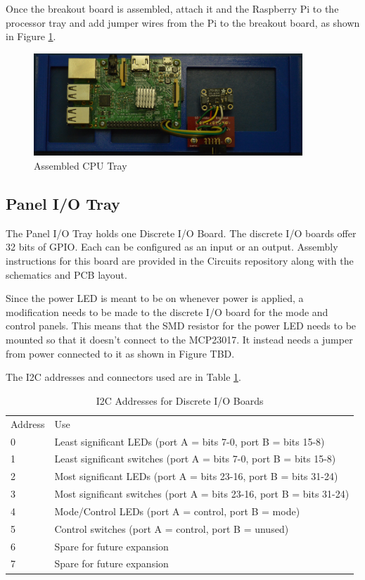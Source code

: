 \documentclass[10pt, openany]{book}
\begin{document}
Once the breakout board is assembled, attach it and the Raspberry Pi to the processor tray and add jumper wires from the Pi to the breakout board, as shown in Figure \ref{fig:CPUTray}.

\begin{figure}[ht!]
  \centering
  \includegraphics[width=0.9\textwidth]{../Pict/CPU-Board.jpg}
  \caption{Assembled CPU Tray}
  \label{fig:CPUTray}
\end{figure}

\clearpage
\subsection{Panel I/O Tray}
The Panel I/O Tray holds one Discrete I/O Board.  The discrete I/O boards offer 32 bits of GPIO.  Each can be configured as an input or an output.  Assembly instructions for this board are provided in the Circuits repository along with the schematics and PCB layout.

Since the power LED is meant to be on whenever power is applied, a modification needs to be made to the discrete I/O board for the mode and control panels.  This means that the SMD resistor for the power LED needs to be mounted so that it doesn't connect to the MCP23017.  It instead needs a jumper from power connected to it as shown in Figure TBD.

The I2C addresses and connectors used are in Table \ref{tbl:i2c}.

\begin{table}
  \label{tbl:i2c}
  \caption{I2C Addresses for Discrete I/O Boards}
  \centering
  \begin{tabular}{|l|l|}
    \hline
    Address & Use\\
    0 & Least significant LEDs (port A = bits 7-0, port B = bits 15-8)\\
    1 & Least significant switches (port A = bits 7-0, port B = bits 15-8)\\
    2 & Most significant LEDs (port A = bits 23-16, port B = bits 31-24)\\
    3 & Most significant switches (port A = bits 23-16, port B = bits 31-24)\\
    4 & Mode/Control LEDs (port A = control, port B = mode)\\
    5 & Control switches (port A = control, port B = unused)\\
    6 & Spare for future expansion\\
    7 & Spare for future expansion\\
    \hline
  \end{tabular}
\end{table}
\end{document}
